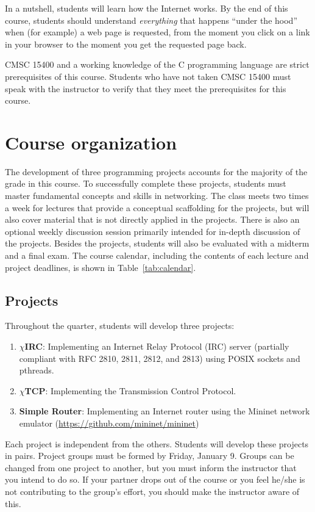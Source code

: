 \documentclass[11pt]{article}
\newcommand{\chirc}{$\chi$\textsf{IRC}}
\newcommand{\chitcp}{$\chi$\textsf{TCP}}
\begin{document}
In a nutshell, students will learn how the Internet works. By the end of this course, students should understand \emph{everything} that happens ``under the hood'' when (for example) a web page is requested, from the moment you click on a link in your browser to the moment you get the requested page back.

CMSC 15400 and a working knowledge of the C programming language are strict prerequisites of this course. Students who have not taken CMSC 15400 must speak with the instructor to verify that they meet the prerequisites for this course.

\section{Course organization}

The development of three programming projects accounts for the majority of the grade in this course. To successfully complete these projects, students must master fundamental concepts and skills in networking. The class meets two times a week for lectures that provide a conceptual scaffolding for the projects, but will also cover material that is not directly applied in the projects. There is also an optional weekly discussion session primarily intended for in-depth discussion of the projects. Besides the projects, students will also be evaluated with a midterm and a final exam. The course calendar, including the contents of each lecture and project deadlines, is shown in Table~\ref{tab:calendar}.

\subsection{Projects}

Throughout the quarter, students will develop three projects:

\begin{enumerate}
 \item \textbf{\chirc}: Implementing an Internet Relay Protocol (IRC) server (partially compliant with RFC 2810, 2811, 2812, and 2813) using POSIX sockets and pthreads.
 \item \textbf{\chitcp}: Implementing the Transmission Control Protocol.
 \item \textbf{Simple Router}: Implementing an Internet router using the Mininet network emulator (\url{https://github.com/mininet/mininet})
\end{enumerate}

Each project is independent from the others. Students will develop these projects in pairs. Project groups must be formed by Friday, January 9. Groups can be changed from one project to another, but you must inform the instructor that you intend to do so. If your partner drops out of the course or you feel he/she is not contributing to the group's effort, you should make the instructor aware of this.
\end{document}

